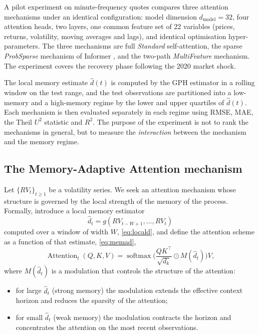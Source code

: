\documentclass[journal]{IEEEtran}
\begin{document}
A pilot experiment on minute-frequency quotes compares three attention mechanisms under an
identical configuration: model dimension $d_{\mathrm{model}}=32$, four attention heads, two
layers, one common feature set of 22 variables (prices, returns, volatility, moving averages and
lags), and identical optimisation hyper-parameters. The three mechanisms are full \emph{Standard}
self-attention, the sparse \emph{ProbSparse} mechanism of Informer \cite{zhou2021informer}, and
the two-path \emph{MultiFeature} mechanism. The experiment covers the recovery phase following
the 2020 market shock.

The local memory estimate $\hat d(t)$ is computed by the GPH estimator in a rolling window on the
test range, and the test observations are partitioned into a low-memory and a high-memory regime
by the lower and upper quartiles of $\hat d(t)$. Each mechanism is then evaluated separately in
each regime using RMSE, MAE, the Theil $U^2$ statistic and $R^2$. The purpose of the experiment
is not to rank the mechanisms in general, but to measure the \emph{interaction} between the
mechanism and the memory regime.

\subsection{The Memory-Adaptive Attention mechanism}\label{sec:memadapt}

Let $\{RV_t\}_{t\ge 1}$ be a volatility series. We seek an attention mechanism whose structure is
governed by the local strength of the memory of the process. Formally, introduce a local memory
estimator
\begin{equation}\label{eq:locald}
\hat d_t=g(RV_{t-W+1},\dots,RV_t)
\end{equation}
computed over a window of width $W$, \eqref{eq:locald}, and define the attention scheme as a
function of that estimate, \eqref{eq:memad},
\begin{equation}\label{eq:memad}
\operatorname{Attention}_t(Q,K,V)=
\operatorname{softmax}\!\Big(\frac{QK^{\top}}{\sqrt{d_k}}\odot M(\hat d_t)\Big)V,
\end{equation}
where $M(\hat d_t)$ is a modulation that controls the structure of the attention:
\begin{itemize}
\item for large $\hat d_t$ (strong memory) the modulation extends the effective context horizon
and reduces the sparsity of the attention;
\item for small $\hat d_t$ (weak memory) the modulation contracts the horizon and concentrates
the attention on the most recent observations.
\end{itemize}
\end{document}
